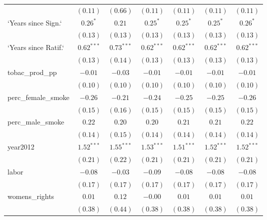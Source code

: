 \begin{table}[!h]
\begin{center}
\begin{tabular}{l c c c c c c }
                        & $(0.11)$     & $(0.66)$     & $(0.11)$     & $(0.11)$     & $(0.11)$     & $(0.11)$     \\
`Years since Sign.`     & $0.26^{*}$   & $0.21$       & $0.25^{*}$   & $0.25^{*}$   & $0.25^{*}$   & $0.26^{*}$   \\
                        & $(0.13)$     & $(0.13)$     & $(0.13)$     & $(0.13)$     & $(0.13)$     & $(0.13)$     \\
`Years since Ratif.`    & $0.62^{***}$ & $0.73^{***}$ & $0.62^{***}$ & $0.62^{***}$ & $0.62^{***}$ & $0.62^{***}$ \\
                        & $(0.13)$     & $(0.14)$     & $(0.13)$     & $(0.13)$     & $(0.13)$     & $(0.13)$     \\
tobac\_prod\_pp         & $-0.01$      & $-0.03$      & $-0.01$      & $-0.01$      & $-0.01$      & $-0.01$      \\
                        & $(0.10)$     & $(0.10)$     & $(0.10)$     & $(0.10)$     & $(0.10)$     & $(0.10)$     \\
perc\_female\_smoke     & $-0.26$      & $-0.21$      & $-0.24$      & $-0.25$      & $-0.25$      & $-0.26$      \\
                        & $(0.15)$     & $(0.16)$     & $(0.15)$     & $(0.15)$     & $(0.15)$     & $(0.15)$     \\
perc\_male\_smoke       & $0.22$       & $0.20$       & $0.20$       & $0.21$       & $0.21$       & $0.22$       \\
                        & $(0.14)$     & $(0.15)$     & $(0.14)$     & $(0.14)$     & $(0.14)$     & $(0.14)$     \\
year2012                & $1.52^{***}$ & $1.55^{***}$ & $1.53^{***}$ & $1.51^{***}$ & $1.52^{***}$ & $1.52^{***}$ \\
                        & $(0.21)$     & $(0.22)$     & $(0.21)$     & $(0.21)$     & $(0.21)$     & $(0.21)$     \\
labor                   & $-0.08$      & $-0.03$      & $-0.09$      & $-0.08$      & $-0.08$      & $-0.08$      \\
                        & $(0.17)$     & $(0.17)$     & $(0.17)$     & $(0.17)$     & $(0.17)$     & $(0.17)$     \\
womens\_rights          & $0.01$       & $0.12$       & $-0.00$      & $0.01$       & $0.01$       & $0.01$       \\
                        & $(0.38)$     & $(0.44)$     & $(0.38)$     & $(0.38)$     & $(0.38)$     & $(0.38)$     \\

\end{tabular}
\end{center}
\end{table}
